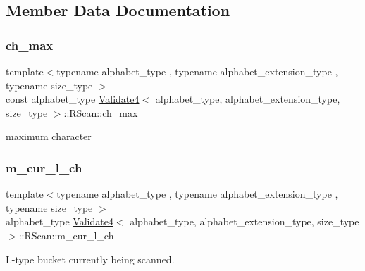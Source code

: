 \subsection{Member Data Documentation}
\mbox{\label{struct_validate4_1_1_r_scan_a3ff6f0be3fd0b25c66913d4d08b2e143}} 
\subsubsection{\texorpdfstring{ch\+\_\+max}{ch\_max}}
{\footnotesize\ttfamily template$<$typename alphabet\+\_\+type , typename alphabet\+\_\+extension\+\_\+type , typename size\+\_\+type $>$ \\
const alphabet\+\_\+type \hyperlink{class_validate4}{Validate4}$<$ alphabet\+\_\+type, alphabet\+\_\+extension\+\_\+type, size\+\_\+type $>$\+::R\+Scan\+::ch\+\_\+max\hspace{0.3cm}{\ttfamily [private]}}



maximum character 

\mbox{\label{struct_validate4_1_1_r_scan_a6ca7516c4fd64e5fe926636ac7197fda}} 
\subsubsection{\texorpdfstring{m\+\_\+cur\+\_\+l\+\_\+ch}{m\_cur\_l\_ch}}
{\footnotesize\ttfamily template$<$typename alphabet\+\_\+type , typename alphabet\+\_\+extension\+\_\+type , typename size\+\_\+type $>$ \\
alphabet\+\_\+type \hyperlink{class_validate4}{Validate4}$<$ alphabet\+\_\+type, alphabet\+\_\+extension\+\_\+type, size\+\_\+type $>$\+::R\+Scan\+::m\+\_\+cur\+\_\+l\+\_\+ch\hspace{0.3cm}{\ttfamily [private]}}



L-\/type bucket currently being scanned. 

\mbox{\label{struct_validate4_1_1_r_scan_a8efbe937773c79d74f444e7f2c71fc8e}} 
